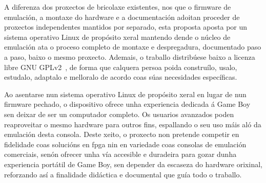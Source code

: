 A diferenza dos proxectos de bricolaxe existentes, nos que o firmware de emulación,
a montaxe do hardware e a documentación adoitan proceder de proxectos independentes
mantidos por separado, esta proposta aposta por un sistema operativo Linux de propósito xeral
mantendo dende o núcleo de emulación ata o proceso completo
de montaxe e despregadura, documentado paso a paso, baixo o mesmo proxecto.
Ademais, o traballo distribúese baixo a licenza libre GNU GPLv2~\cite{gplv2},
de forma que calquera persoa poida construílo, usalo, estudalo, adaptalo e melloralo
de acordo coas súas necesidades específicas.

Ao asentarse nun sistema operativo Linux de propósito xeral
en lugar de nun firmware pechado,
o dispositivo ofrece unha experiencia dedicada á Game Boy
sen deixar de ser un computador completo.
Os usuarios avanzados poden reaproveitar o mesmo hardware para outros fins,
espallando o seu uso máis aló da emulación desta consola.
Deste xeito, o proxecto non pretende competir en fidelidade coas solucións en \acrshort{fpga}
nin en variedade coas consolas de emulación comerciais,
senón ofrecer unha vía accesible e duradeira
para gozar dunha experiencia portátil de Game Boy,
sen depender da escaseza do hardware orixinal,
reforzando así a finalidade didáctica e documental que guía todo o traballo.
